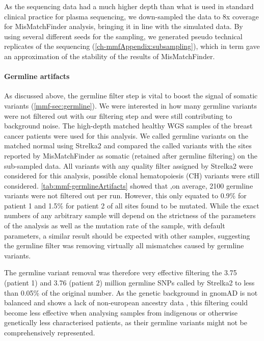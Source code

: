 As the sequencing data had a much higher depth than what is used in standard clinical practice for plasma sequencing, we down-sampled the data to 8x coverage for MisMatchFinder analysis, bringing it in line with the simulated data. By using several different seeds for the sampling, we generated pseudo technical replicates of the sequencing (\autoref{ch-mmfAppendix:subsampling}), which in term gave an approximation of the stability of the results of MisMatchFinder.


\paragraph{Germline artifacts}
\label{mmf-sec:germlineArtifacts}
As discussed above, the germline filter step is vital to boost the signal of somatic variants (\autoref{mmf-sec:germline}). We were interested in how many germline variants were not filtered out with our filtering step and were still contributing to background noise. The high-depth matched healthy WGS samples of the breast cancer patients were used for this analysis. We called germline variants on the matched normal using Strelka2 and compared the called variants with the sites reported by MisMatchFinder as somatic (retained after germline filtering) on the sub-sampled data. All variants with any quality filter assigned by Strelka2 were considered for this analysis,  possible clonal hematopoiesis (CH) variants were still considered. \autoref{tab:mmf-germlineArtifacts} showed that ,on average, 2100 germline variants were not filtered out per run. However, this only equated to 0.9\% for patient 1 and 1.5\% for patient 2 of all sites found to be mutated. While the exact numbers of any arbitrary sample will depend on the strictness of the parameters of the analysis as well as the mutation rate of the sample, with default parameters, a similar result should be expected with other samples, suggesting the germline filter was removing virtually all mismatches caused by germline variants.

The germline variant removal was therefore very effective filtering the 3.75 (patient 1) and 3.76 (patient 2) million germline SNPs called by Strelka2 to less than 0.05\% of the original number. As the genetic background in gnomAD is not balanced and shows a lack of non-european ancestry data \cite{Tiao2020}, this filtering could become less effective when analysing samples from indigenous or otherwise genetically less characterised patients, as their germline variants might not be comprehensively represented.

